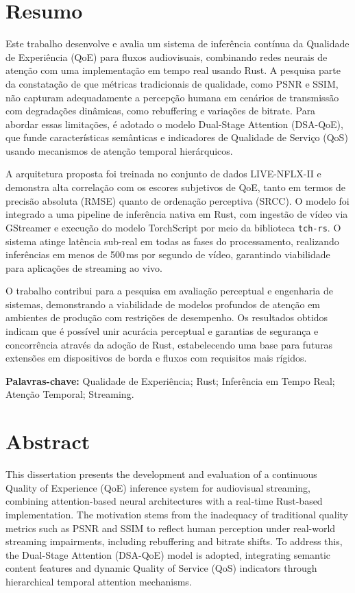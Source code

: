 \chapter*{Resumo}
Este trabalho desenvolve e avalia um sistema de inferência contínua da Qualidade de Experiência (QoE) para fluxos audiovisuais, combinando redes neurais de atenção com uma implementação em tempo real usando Rust. A pesquisa parte da constatação de que métricas tradicionais de qualidade, como PSNR e SSIM, não capturam adequadamente a percepção humana em cenários de transmissão com degradações dinâmicas, como rebuffering e variações de bitrate. Para abordar essas limitações, é adotado o modelo Dual-Stage Attention (DSA-QoE), que funde características semânticas e indicadores de Qualidade de Serviço (QoS) usando mecanismos de atenção temporal hierárquicos.

A arquitetura proposta foi treinada no conjunto de dados LIVE-NFLX-II e demonstra alta correlação com os escores subjetivos de QoE, tanto em termos de precisão absoluta (RMSE) quanto de ordenação perceptiva (SRCC). O modelo foi integrado a uma pipeline de inferência nativa em Rust, com ingestão de vídeo via GStreamer e execução do modelo TorchScript por meio da biblioteca \texttt{tch-rs}. O sistema atinge latência sub-real em todas as fases do processamento, realizando inferências em menos de 500\,ms por segundo de vídeo, garantindo viabilidade para aplicações de streaming ao vivo.

O trabalho contribui para a pesquisa em avaliação perceptual e engenharia de sistemas, demonstrando a viabilidade de modelos profundos de atenção em ambientes de produção com restrições de desempenho. Os resultados obtidos indicam que é possível unir acurácia perceptual e garantias de segurança e concorrência através da adoção de Rust, estabelecendo uma base para futuras extensões em dispositivos de borda e fluxos com requisitos mais rígidos.

\textbf{Palavras-chave:} Qualidade de Experiência; Rust; Inferência em Tempo Real; Atenção Temporal; Streaming.


\chapter*{Abstract}
This dissertation presents the development and evaluation of a continuous Quality of Experience (QoE) inference system for audiovisual streaming, combining attention-based neural architectures with a real-time Rust-based implementation. The motivation stems from the inadequacy of traditional quality metrics such as PSNR and SSIM to reflect human perception under real-world streaming impairments, including rebuffering and bitrate shifts. To address this, the Dual-Stage Attention (DSA-QoE) model is adopted, integrating semantic content features and dynamic Quality of Service (QoS) indicators through hierarchical temporal attention mechanisms.


